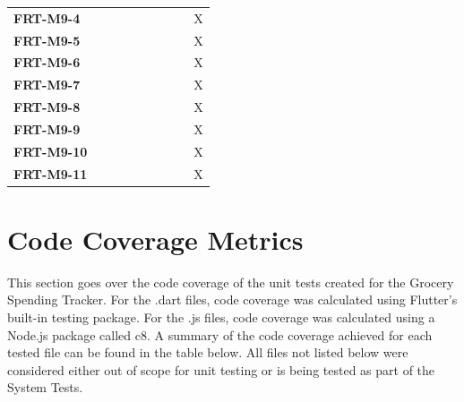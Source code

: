 \documentclass[12pt, titlepage]{article}
\begin{document}
\begin{longtable}{|l|cccccc|}
  \textbf{FRT-M9-4} & ~ & ~ & ~ & ~ & ~ & X \\
  \textbf{FRT-M9-5} & ~ & ~ & ~ & ~ & ~ & X \\
  \textbf{FRT-M9-6} & ~ & ~ & ~ & ~ & ~ & X \\
  \textbf{FRT-M9-7} & ~ & ~ & ~ & ~ & ~ & X \\
  \textbf{FRT-M9-8} & ~ & ~ & ~ & ~ & ~ & X \\
  \textbf{FRT-M9-9} & ~ & ~ & ~ & ~ & ~ & X \\
  \textbf{FRT-M9-10} & ~ & ~ & ~ & ~ & ~ & X \\
  \textbf{FRT-M9-11} & ~ & ~ & ~ & ~ & ~ & X \\
  \hline
\end{longtable}

\section{Code Coverage Metrics}

This section goes over the code coverage of the unit tests created for the Grocery Spending Tracker.
For the .dart files, code coverage was calculated using Flutter's built-in testing package. For the .js files,
code coverage was calculated using a Node.js package called c8. A summary of the code coverage achieved for
each tested file can be found in the table below. All files not listed below were considered either out of scope for
unit testing or is being tested as part of the System Tests.
\end{document}
